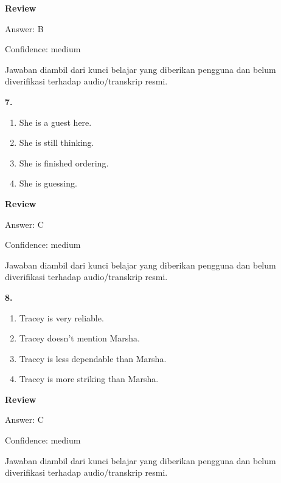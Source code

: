 \documentclass[12pt]{article}
\begin{document}
\par
\begingroup
\setlength{\parskip}{0pt}
\setlength{\parindent}{0pt}
\textbf{Review}\par
Answer: B\par
Confidence: medium\par
Jawaban diambil dari kunci belajar yang diberikan pengguna dan belum diverifikasi terhadap audio/transkrip resmi.\par
\endgroup
\par
\vspace{0.25\baselineskip}
\noindent\textbf{7.}
\begin{enumerate}[label=(\Alph*),leftmargin=*,itemsep=0.2em]
\item She is a guest here.
\item She is still thinking.
\item She is finished ordering.
\item She is guessing.
\end{enumerate}
\par
\begingroup
\setlength{\parskip}{0pt}
\setlength{\parindent}{0pt}
\textbf{Review}\par
Answer: C\par
Confidence: medium\par
Jawaban diambil dari kunci belajar yang diberikan pengguna dan belum diverifikasi terhadap audio/transkrip resmi.\par
\endgroup
\par
\vspace{0.25\baselineskip}
\noindent\textbf{8.}
\begin{enumerate}[label=(\Alph*),leftmargin=*,itemsep=0.2em]
\item Tracey is very reliable.
\item Tracey doesn't mention Marsha.
\item Tracey is less dependable than Marsha.
\item Tracey is more striking than Marsha.
\end{enumerate}
\par
\begingroup
\setlength{\parskip}{0pt}
\setlength{\parindent}{0pt}
\textbf{Review}\par
Answer: C\par
Confidence: medium\par
Jawaban diambil dari kunci belajar yang diberikan pengguna dan belum diverifikasi terhadap audio/transkrip resmi.\par
\endgroup
\par
\vspace{0.25\baselineskip}
\end{document}

